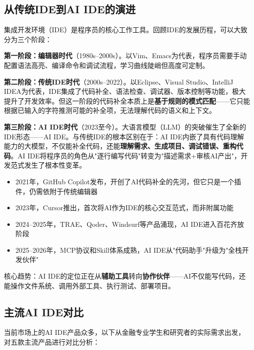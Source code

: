 \subsection{从传统IDE到AI IDE的演进}

集成开发环境（IDE）是程序员的核心工作工具。回顾IDE的发展历程，可以大致分为三个阶段：

\textbf{第一阶段：编辑器时代}（1980s--2000s）。以Vim、Emacs为代表，程序员需要手动配置语法高亮、编译命令和调试流程，学习曲线陡峭但高度可定制。

\textbf{第二阶段：传统IDE时代}（2000s--2022）。以Eclipse、Visual Studio、IntelliJ IDEA为代表，IDE集成了代码补全、语法检查、调试器、版本控制等功能，极大提升了开发效率。但这一阶段的代码补全本质上是\textbf{基于规则的模式匹配}——它只能根据已输入的字符推测可能的补全项，无法理解代码的语义和上下文。

\textbf{第三阶段：AI IDE时代}（2023至今）。大语言模型（LLM）的突破催生了全新的IDE形态——AI IDE。与传统IDE的根本区别在于：AI IDE内嵌了具有代码理解能力的大模型，不仅能补全代码，还能\textbf{理解需求、生成项目、调试错误、重构代码}。AI IDE将程序员的角色从"逐行编写代码"转变为"描述需求+审核AI产出"，开发范式发生了根本性变革。

\begin{theorybox}
\begin{itemize}[leftmargin=2em]
  \item 2021年，GitHub Copilot发布，开创了AI代码补全的先河，但它只是一个插件，仍需依附于传统编辑器
  \item 2023年，Cursor推出，首次将AI作为IDE的核心交互范式，而非附属功能
  \item 2024--2025年，TRAE、Qoder、Windsurf等产品涌现，AI IDE进入百花齐放阶段
  \item 2025--2026年，MCP协议和Skill体系成熟，AI IDE从"代码助手"升级为"全栈开发伙伴"
\end{itemize}
核心趋势：AI IDE的定位正在从\textbf{辅助工具}转向\textbf{协作伙伴}——AI不仅能写代码，还能操作文件系统、调用外部工具、执行测试、部署项目。
\end{theorybox}

\subsection{主流AI IDE对比}

当前市场上的AI IDE产品众多，以下从金融专业学生和研究者的实际需求出发，对五款主流产品进行对比分析：

